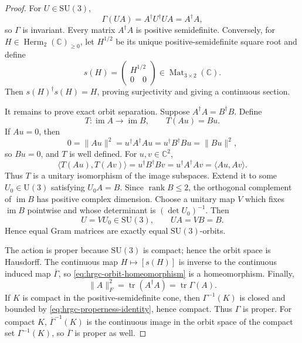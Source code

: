 \begin{proof}
For \(U\in\mathrm{SU}(3)\),
\[
 \Gamma(UA)=A^\dagger U^\dagger UA=A^\dagger A,
\]
so \(\Gamma\) is invariant.  Every matrix \(A^\dagger A\) is positive
semidefinite.  Conversely, for
\(H\in\operatorname{Herm}_2(\mathbb C)_{\geq0}\), let \(H^{1/2}\) be its
unique positive-semidefinite square root and define
\begin{equation}
 s(H)=
 \begin{pmatrix}
  H^{1/2}\\
  0\quad0
 \end{pmatrix}\in\operatorname{Mat}_{3\times2}(\mathbb C).
 \label{eq:hrgc-square-root-section}
\end{equation}
Then \(s(H)^\dagger s(H)=H\), proving surjectivity and giving a continuous
section.

It remains to prove exact orbit separation.  Suppose
\(A^\dagger A=B^\dagger B\).  Define
\[
 T:\operatorname{im}A\longrightarrow\operatorname{im}B,
 \qquad T(Au)=Bu.
\]
If \(Au=0\), then
\[
 0=\lVert Au\rVert^2
  =u^\dagger A^\dagger Au
  =u^\dagger B^\dagger Bu
  =\lVert Bu\rVert^2,
\]
so \(Bu=0\), and \(T\) is well defined.  For \(u,v\in\mathbb C^2\),
\[
 \langle T(Au),T(Av)\rangle
 =u^\dagger B^\dagger Bv
 =u^\dagger A^\dagger Av
 =\langle Au,Av\rangle.
\]
Thus \(T\) is a unitary isomorphism of the image subspaces.  Extend it to
some \(U_0\in\mathrm U(3)\) satisfying \(U_0A=B\).  Since
\(\operatorname{rank}B\leq2\), the orthogonal complement of
\(\operatorname{im}B\) has positive complex dimension.  Choose a unitary
map \(V\) which fixes \(\operatorname{im}B\) pointwise and whose determinant
is \((\det U_0)^{-1}\).  Then
\[
 U=VU_0\in\mathrm{SU}(3),
 \qquad UA=VB=B.
\]
Hence equal Gram matrices are exactly equal \(\mathrm{SU}(3)\)-orbits.

The action is proper because \(\mathrm{SU}(3)\) is compact; hence the orbit
space is Hausdorff.  The continuous map
\(H\mapsto[s(H)]\) is inverse to the continuous induced map
\(\overline\Gamma\), so \eqref{eq:hrgc-orbit-homeomorphism} is a
homeomorphism.  Finally,
\begin{equation}
 \lVert A\rVert_F^2=\operatorname{tr}(A^\dagger A)
 =\operatorname{tr}\Gamma(A).
 \label{eq:hrgc-properness-identity}
\end{equation}
If \(K\) is compact in the positive-semidefinite cone, then
\(\Gamma^{-1}(K)\) is closed and bounded by
\eqref{eq:hrgc-properness-identity}, hence compact.  Thus \(\Gamma\) is
proper.  For compact \(K\),
\(\overline\Gamma^{-1}(K)\) is the continuous image in the orbit space of
the compact set \(\Gamma^{-1}(K)\), so \(\overline\Gamma\) is proper as
well.
\end{proof}

